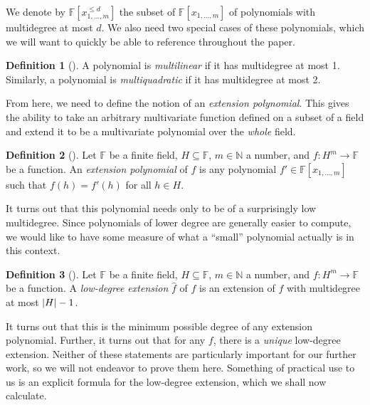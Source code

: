 \documentclass[english]{reedthesis}
\theoremstyle{plain}
\theoremstyle{definition}
\newtheorem{defn}[defn]{Definition}
\theoremstyle{remark}
\DeclarePairedDelimiter{\abs}{\lvert}{\rvert}
\begin{document}
We denote by $\mathbb{F}[x_{1, \ldots, m}^{\le d}]$ the subset of
$\mathbb{F}[x_{1, \ldots, m}]$ of polynomials with multidegree at most $d$. We also
need two special cases of these polynomials, which we will want to quickly be
able to reference throughout the paper.

\begin{defn}[{\cite[8]{AW09}}]\label{def:mlin}
  A polynomial is \emph{multilinear} if it has multidegree at most 1. Similarly,
  a polynomial is \emph{multiquadratic} if it has multidegree at most 2.
\end{defn}

From here, we need to define the notion of an \emph{extension polynomial}. This
gives the ability to take an arbitrary multivariate function defined on a subset
of a field and extend it to be a multivariate polynomial over the \emph{whole}
field.

\begin{defn}[{\cite[8]{AW09}}]\label{def:ext-poly}
  Let $\mathbb{F}$ be a finite field, $H \subseteq \mathbb{F}$, $m \in \mathbb{N}$ a number, and
  $f: H^{m} \rightarrow \mathbb{F}$ be a function. An \emph{extension polynomial} of $f$
  is any polynomial $f' \in \mathbb{F}[x_{1, \ldots, m}]$ such that $f(h) = f'(h)$ for
  all $h \in H$.
\end{defn}

It turns out that this polynomial needs only to be of a surprisingly low
multidegree. Since polynomials of lower degree are generally easier to compute,
we would like to have some measure of what a ``small'' polynomial actually is in
this context.

\begin{defn}[{\cite[]{CFGS22}}]\label{def:low-deg-ext}
  Let $\mathbb{F}$ be a finite field, $H \subseteq \mathbb{F}$, $m \in \mathbb{N}$ a number, and
  $f: H^{m} \rightarrow \mathbb{F}$ be a function. A \emph{low-degree extension} $\hat{f}$
  of $f$ is an extension of $f$ with multidegree at most $\abs{H} - 1$.
\end{defn}

It turns out that this is the minimum possible degree of any extension
polynomial. Further, it turns out that for any $f$, there is a \emph{unique}
low-degree extension. Neither of these statements are particularly important for
our further work, so we will not endeavor to prove them here. Something of
practical use to us is an explicit formula for the low-degree extension, which
we shall now calculate.
\end{document}
